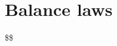 \documentclass[
  letterpaper,
  DIV=11,
  numbers=noendperiod]{scrreprt}
\theoremstyle{plain}
\theoremstyle{remark}
\begin{document}

\chapter{Balance laws}\label{sec-balance-laws}

\$\$ \newcommand{\bfa}{{\boldsymbol{a}}}
\newcommand{\bfb}{{\boldsymbol{b}}} \newcommand{\bfc}{{\boldsymbol{c}}}
\newcommand{\bfd}{{\boldsymbol{d}}} \newcommand{\bfe}{{\boldsymbol{e}}}
\newcommand{\bff}{{\boldsymbol{f}}} \newcommand{\bfg}{{\boldsymbol{g}}}
\newcommand{\bfh}{{\boldsymbol{h}}} \newcommand{\bfi}{{\boldsymbol{i}}}
\newcommand{\bfj}{{\boldsymbol{j}}} \newcommand{\bfk}{{\boldsymbol{k}}}
\newcommand{\bfl}{{\boldsymbol{l}}} \newcommand{\bfm}{{\boldsymbol{m}}}
\newcommand{\bfn}{{\boldsymbol{n}}} \newcommand{\bfo}{{\boldsymbol{o}}}
\newcommand{\bfp}{{\boldsymbol{p}}} \newcommand{\bfq}{{\boldsymbol{q}}}
\newcommand{\bfr}{{\boldsymbol{r}}} \newcommand{\bfs}{{\boldsymbol{s}}}
\newcommand{\bft}{{\boldsymbol{t}}} \newcommand{\bfu}{{\boldsymbol{u}}}
\newcommand{\bfv}{{\boldsymbol{v}}} \newcommand{\bfw}{{\boldsymbol{w}}}
\newcommand{\bfx}{{\boldsymbol{x}}} \newcommand{\bfy}{{\boldsymbol{y}}}
\newcommand{\bfz}{{\boldsymbol{z}}}

\newcommand{\bfA}{{\boldsymbol{A}}}
\newcommand{\bfB}{{\boldsymbol{B}}}
\newcommand{\bfC}{{\boldsymbol{C}}}
\newcommand{\bfD}{{\boldsymbol{D}}}
\newcommand{\bfE}{{\boldsymbol{E}}}
\newcommand{\bfF}{{\boldsymbol{F}}}
\newcommand{\bfG}{{\boldsymbol{G}}}
\newcommand{\bfH}{{\boldsymbol{H}}}
\newcommand{\bfI}{{\boldsymbol{I}}}
\newcommand{\bfJ}{{\boldsymbol{J}}}
\newcommand{\bfK}{{\boldsymbol{K}}}
\newcommand{\bfL}{{\boldsymbol{L}}}
\newcommand{\bfM}{{\boldsymbol{M}}}
\newcommand{\bfN}{{\boldsymbol{N}}}
\newcommand{\bfO}{{\boldsymbol{O}}}
\newcommand{\bfP}{{\boldsymbol{P}}}
\newcommand{\bfQ}{{\boldsymbol{Q}}}
\newcommand{\bfR}{{\boldsymbol{R}}}
\newcommand{\bfS}{{\boldsymbol{S}}}
\newcommand{\bfT}{{\boldsymbol{T}}}
\newcommand{\bfU}{{\boldsymbol{U}}}
\newcommand{\bfV}{{\boldsymbol{V}}}
\newcommand{\bfW}{{\boldsymbol{W}}}
\newcommand{\bfX}{{\boldsymbol{X}}}
\newcommand{\bfY}{{\boldsymbol{Y}}}
\newcommand{\bfZ}{{\boldsymbol{Z}}}
\end{document}
